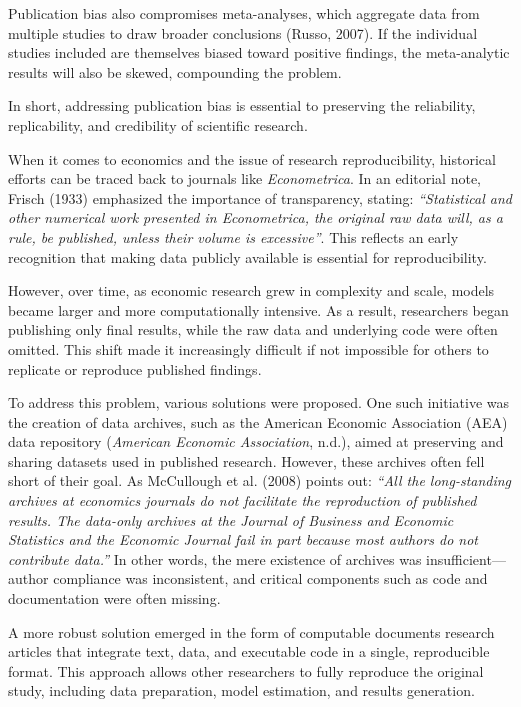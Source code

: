 \documentclass[
  a4paper,
]{article}
\begin{document}
Publication bias also compromises meta-analyses, which aggregate data
from multiple studies to draw broader conclusions (Russo, 2007). If the
individual studies included are themselves biased toward positive
findings, the meta-analytic results will also be skewed, compounding the
problem.

In short, addressing publication bias is essential to preserving the
reliability, replicability, and credibility of scientific research.

When it comes to economics and the issue of research reproducibility,
historical efforts can be traced back to journals like
\emph{Econometrica}. In an editorial note, Frisch (1933) emphasized the
importance of transparency, stating: \emph{``Statistical and other
numerical work presented in Econometrica, the original raw data will, as
a rule, be published, unless their volume is excessive''}. This reflects
an early recognition that making data publicly available is essential
for reproducibility.

However, over time, as economic research grew in complexity and scale,
models became larger and more computationally intensive. As a result,
researchers began publishing only final results, while the raw data and
underlying code were often omitted. This shift made it increasingly
difficult if not impossible for others to replicate or reproduce
published findings.

To address this problem, various solutions were proposed. One such
initiative was the creation of data archives, such as the American
Economic Association (AEA) data repository (\emph{American {Economic
Association}}, n.d.), aimed at preserving and sharing datasets used in
published research. However, these archives often fell short of their
goal. As McCullough et al. (2008) points out: \emph{``All the
long-standing archives at economics journals do not facilitate the
reproduction of published results. The data-only archives at the Journal
of Business and Economic Statistics and the Economic Journal fail in
part because most authors do not contribute data.''} In other words, the
mere existence of archives was insufficient---author compliance was
inconsistent, and critical components such as code and documentation
were often missing.

A more robust solution emerged in the form of computable documents
research articles that integrate text, data, and executable code in a
single, reproducible format. This approach allows other researchers to
fully reproduce the original study, including data preparation, model
estimation, and results generation.
\end{document}

